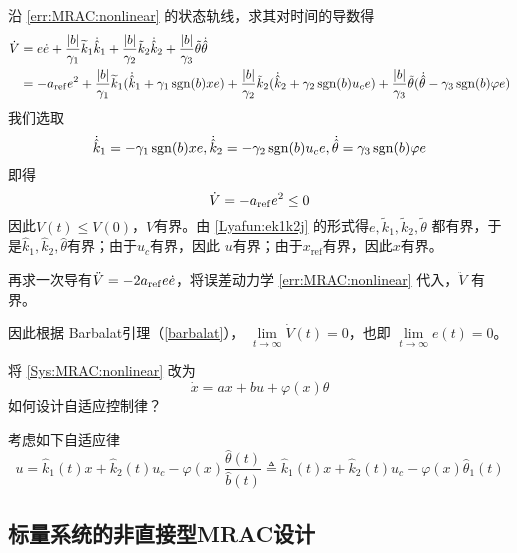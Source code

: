 沿 \eqref{err:MRAC:nonlinear} 的状态轨线，求其对时间的导数得
\begin{align*}
  \dot{V} & =  e  \dot{e}
  + \frac{| b |}{\gamma_1} \widetilde{ k} _1\dot{\hat{k}} _1
  + \frac{| b |}{\gamma_2} \tilde{k} _2 \dot{\hat{k}} _2
  + \frac{| b |}{\gamma_3} \tilde{\theta}  \dot{\hat{\theta}} \\
          & =  - a_{\operatorname{ref}} e^2
  + \frac{| b |}{\gamma_1} \widetilde{ k} _1 (\dot{\hat{k}}_1+ \gamma_1 \operatorname{sgn} (b) x  e)
  + \frac{| b |}{\gamma_2} \tilde{k}_2 (\dot{\hat{k}}_2+ \gamma_2 \operatorname{sgn} (b)  u_c e)
  +\frac{| b |}{\gamma_3} \tilde{\theta} (\dot{\hat{\theta}}- \gamma_3\operatorname{sgn} (b) \varphi e)
\end{align*}
我们选取
\begin{equation*}
  \dot{\hat{k}}_1 = -  \gamma_1 \operatorname{sgn} (b) x  e,
  \dot{\hat{k}}_2 = -  \gamma_2 \operatorname{sgn} (b) u_c e,
  \dot{\hat{\theta}} = \gamma_3 \operatorname{sgn} (b) \varphi e
\end{equation*}
即得
\begin{equation*}
  \dot{V} = - a_{\operatorname{ref}} e^2 \leq 0
\end{equation*}
因此$V (t) \leq V (0)$，$V$有界。由 \eqref{Lyafun:ek1k2j} 的形式得$e, \tilde{k} _1, \tilde{k} _2, \tilde{\theta}$ 都有界，于是$\hat{k}_1,\hat{k}_2,\hat{\theta}$有界；由于$u_c$有界，因此 $u$有界；由于$x_\mathrm{ref}$有界，因此$x$有界。

再求一次导有$ \ddot{V} = - 2 a_{\operatorname{ref}} e  \dot{e} $，将误差动力学 \eqref{err:MRAC:nonlinear} 代入，$\ddot{V}$ 有界。

因此根据 Barbalat引理（\ref{barbalat}）， $\lim\limits_{t \rightarrow \infty} \dot{V} (t) = 0$，也即 $\lim\limits_{t \rightarrow \infty} e (t) = 0$。

\begin{problem}\label{Pro:scalar_with_uncertainty}
将 \eqref{Sys:MRAC:nonlinear} 改为
\[ \dot{x} = a  x + b  u + \varphi(x) \theta \]
如何设计自适应控制律？
\end{problem}
\begin{hint}
  考虑如下自适应律
  \[ u = \hat{k}_1 (t) x + \hat{k}_2 (t) u_c
    - \varphi (x)  \frac{\hat{\theta} (t)}{\hat{b} (t)} \triangleq \hat{k}_1 (t) x
    +\hat{k}_2 (t) u_c - \varphi (x) \hat{\theta}_1 (t) \]
\end{hint}

\subsection{标量系统的非直接型MRAC设计}

